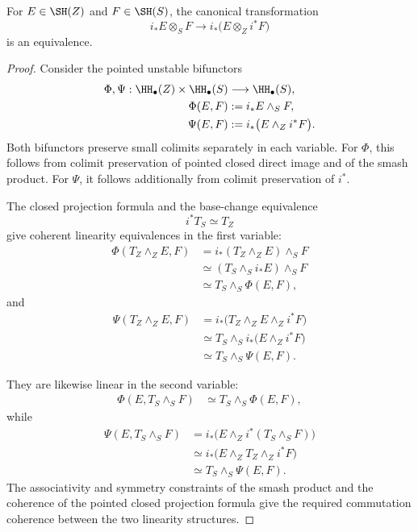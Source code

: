 \begin{theorem}
\label{thm:stable-closed-projection}
For \(E\in\SH(Z)\) and \(F\in\SH(S)\), the canonical transformation
\[
    i_*E\otimes_SF
    \longrightarrow
    i_*\bigl(E\otimes_Zi^*F\bigr)
\]
is an equivalence.
\end{theorem}

\begin{proof}
Consider the pointed unstable bifunctors
\[
\begin{aligned}
    \Phi,\Psi:
    \HH_\bullet(Z)\times\HH_\bullet(S)
    &\longrightarrow
    \HH_\bullet(S), \\
    \Phi(E,F)
    &:=
    i_*E\wedge_SF, \\
    \Psi(E,F)
    &:=
    i_*\bigl(E\wedge_Zi^*F\bigr).
\end{aligned}
\]
Both bifunctors preserve small colimits separately in each variable.  For
\(\Phi\), this follows from colimit preservation of pointed closed direct
image and of the smash product.  For \(\Psi\), it follows additionally from
colimit preservation of \(i^*\).

The closed projection formula and the base-change equivalence
\[
    i^*T_S\simeq T_Z
\]
give coherent linearity equivalences in the first variable:
\[
\begin{aligned}
    \Phi(T_Z\wedge_ZE,F)
    &=
    i_*(T_Z\wedge_ZE)\wedge_SF \\
    &\simeq
    (T_S\wedge_Si_*E)\wedge_SF \\
    &\simeq
    T_S\wedge_S\Phi(E,F),
\end{aligned}
\]
and
\[
\begin{aligned}
    \Psi(T_Z\wedge_ZE,F)
    &=
    i_*\bigl(
      T_Z\wedge_ZE\wedge_Zi^*F
    \bigr) \\
    &\simeq
    T_S\wedge_S
    i_*\bigl(E\wedge_Zi^*F\bigr) \\
    &\simeq
    T_S\wedge_S\Psi(E,F).
\end{aligned}
\]

They are likewise linear in the second variable:
\[
\begin{aligned}
    \Phi(E,T_S\wedge_SF)
    &\simeq
    T_S\wedge_S\Phi(E,F),
\end{aligned}
\]
while
\[
\begin{aligned}
    \Psi(E,T_S\wedge_SF)
    &=
    i_*\bigl(
      E\wedge_Zi^*(T_S\wedge_SF)
    \bigr) \\
    &\simeq
    i_*\bigl(
      E\wedge_ZT_Z\wedge_Zi^*F
    \bigr) \\
    &\simeq
    T_S\wedge_S\Psi(E,F).
\end{aligned}
\]
The associativity and symmetry constraints of the smash product and the
coherence of the pointed closed projection formula give the required
commutation coherence between the two linearity structures.


\end{proof}

